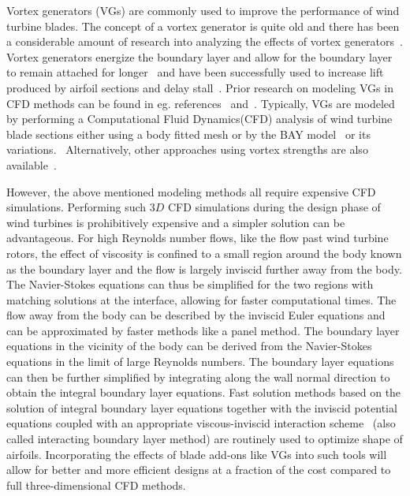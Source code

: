 Vortex generators (VGs) are commonly used to improve the performance of wind turbine blades.
The concept of a vortex generator is quite old and there has been a considerable amount of research into analyzing the effects of vortex generators~\cite{lin2002review, Schubauer1960}. Vortex generators energize the boundary layer and allow for the boundary layer to remain attached for longer~\cite{Cutler1993, Cutler1993a} and have been successfully used to increase lift produced by airfoil sections and delay stall~\cite{WindtunnelDTUold}. Prior research on modeling VGs in CFD methods can be found in eg. references~\cite{Florentie2017} and~\cite{Fernandez2012}. Typically, VGs are modeled by performing a Computational Fluid Dynamics(CFD) analysis of wind turbine blade sections either using a body fitted mesh or by the BAY model~\cite{bender1999vortex} or its variations.~\cite{jbaymodel} Alternatively, other approaches using vortex strengths are also available~\cite{comparisondtu}. 

However, the above mentioned modeling methods all require expensive CFD simulations. Performing such $3D$ CFD simulations during the design phase of wind turbines is prohibitively expensive and a simpler solution can be advantageous. 
For high Reynolds number flows, like the flow past wind turbine rotors, the effect of viscosity is confined to a small region around the body known as the boundary layer and the flow is largely inviscid further away from the body. The Navier-Stokes equations can thus be simplified for the two regions with matching solutions at the interface, allowing for faster computational times. The flow away from the body can be described by the inviscid Euler equations and can be approximated by faster methods like a panel method. The boundary layer equations in the vicinity of the body can be derived from the Navier-Stokes equations in the limit of large Reynolds numbers. The boundary layer equations can then be further simplified by integrating along the wall normal direction to obtain the integral boundary layer equations. 
Fast solution methods based on the solution of integral boundary layer equations together with the inviscid potential equations coupled with an appropriate viscous-inviscid interaction scheme~\cite{drela1989xfoil, RFOIL1, ozdemir2017unsteady} (also called interacting boundary layer method) are routinely used to optimize shape of airfoils. 
Incorporating the effects of blade add-ons like VGs into such tools will allow for better and more efficient designs at a fraction of the cost compared to full three-dimensional CFD methods.

